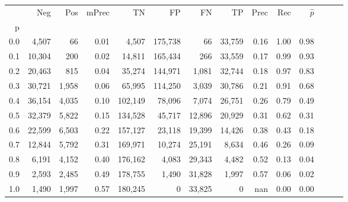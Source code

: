 \begin{tabular}{rrrrrrrrrrrrrr}
\toprule
{} &     Neg &    Pos & mPrec &       TN &       FP &      FN &      TP &  Prec &   Rec & $\hat{p}$ \\
p   &         &        &       &          &          &         &         &       &       &           \\
\midrule
0.0 &   4,507 &     66 &  0.01 &    4,507 &  175,738 &      66 &  33,759 &  0.16 &  1.00 &      0.98 \\
0.1 &  10,304 &    200 &  0.02 &   14,811 &  165,434 &     266 &  33,559 &  0.17 &  0.99 &      0.93 \\
0.2 &  20,463 &    815 &  0.04 &   35,274 &  144,971 &   1,081 &  32,744 &  0.18 &  0.97 &      0.83 \\
0.3 &  30,721 &  1,958 &  0.06 &   65,995 &  114,250 &   3,039 &  30,786 &  0.21 &  0.91 &      0.68 \\
0.4 &  36,154 &  4,035 &  0.10 &  102,149 &   78,096 &   7,074 &  26,751 &  0.26 &  0.79 &      0.49 \\
0.5 &  32,379 &  5,822 &  0.15 &  134,528 &   45,717 &  12,896 &  20,929 &  0.31 &  0.62 &      0.31 \\
0.6 &  22,599 &  6,503 &  0.22 &  157,127 &   23,118 &  19,399 &  14,426 &  0.38 &  0.43 &      0.18 \\
0.7 &  12,844 &  5,792 &  0.31 &  169,971 &   10,274 &  25,191 &   8,634 &  0.46 &  0.26 &      0.09 \\
0.8 &   6,191 &  4,152 &  0.40 &  176,162 &    4,083 &  29,343 &   4,482 &  0.52 &  0.13 &      0.04 \\
0.9 &   2,593 &  2,485 &  0.49 &  178,755 &    1,490 &  31,828 &   1,997 &  0.57 &  0.06 &      0.02 \\
1.0 &   1,490 &  1,997 &  0.57 &  180,245 &        0 &  33,825 &       0 &   nan &  0.00 &      0.00 \\
\bottomrule
\end{tabular}

